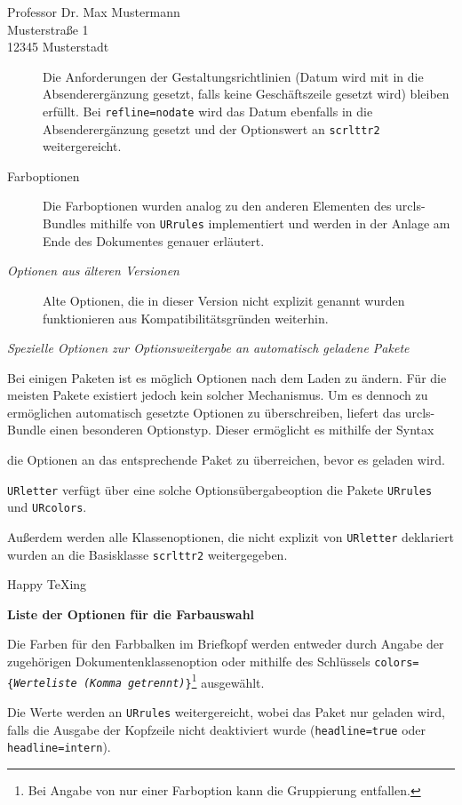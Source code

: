 \documentclass[english,parskip=half,colors={faculties,rz},headline=color]{URletter}
\newcommand*\pck[1]{\texttt{#1}}
\newcommand*\code[1]{\texttt{#1}}
\newcommand*\repl[1]{\textnormal{\textit{#1}}}
\newcommand*\cmd[1]{\par\vspace{-\parskip}\medskip\noindent\fbox{\ttfamily#1}\par\vspace{-\parskip}\medskip}
\newcommand*\heading[1]{\par\bigskip\emph{#1}\par\nobreak}
\begin{document}
\begin{letter}{Professor Dr. Max Mustermann\\Musterstraße 1\\12345 Musterstadt}
\begin{description}
	Die Anforderungen der Gestaltungsrichtlinien (Datum wird mit in die Absenderergänzung gesetzt, falls keine Geschäftszeile gesetzt wird) bleiben erfüllt. Bei \code{refline=nodate} wird das Datum ebenfalls in die Absenderergänzung gesetzt und der Optionswert an \pck{scrlttr2} weitergereicht.
	\item[Farboptionen] Die Farboptionen wurden analog zu den anderen Elementen des urcls-Bundles mithilfe von \pck{URrules} implementiert und werden in der Anlage am Ende des Dokumentes genauer erläutert.
	\item[\sffamily\itshape\mdseries Optionen aus älteren Versionen] Alte Optionen, die in dieser Version nicht explizit genannt wurden funktionieren aus Kompatibilitätsgründen weiterhin.
\end{description}

\heading{Spezielle Optionen zur Optionsweitergabe an automatisch geladene Pakete}

Bei einigen Paketen ist es möglich Optionen nach dem Laden zu ändern. Für die meisten Pakete existiert jedoch kein solcher Mechanismus. Um es dennoch zu ermöglichen automatisch gesetzte Optionen zu überschreiben, liefert das urcls-Bundle einen besonderen Optionstyp. Dieser ermöglicht es mithilfe der Syntax
\cmd{\repl{Paketname}=\{\repl{Option1},\repl{Option2}\}}
die Optionen an das entsprechende Paket zu überreichen, bevor es geladen wird.

\pck{URletter} verfügt über eine solche Optionsübergabeoption die Pakete \pck{URrules} und \pck{URcolors}.

Außerdem werden alle Klassenoptionen, die nicht explizit von \pck{URletter} deklariert wurden an die Basisklasse \pck{scrlttr2} weitergegeben.



\closing{Happy \TeX{}ing}


\end{letter}


\pagestyle{empty}
\textbf{\LARGE Liste der Optionen für die Farbauswahl}

\vspace{\baselineskip}
Die Farben für den Farbbalken im Briefkopf werden entweder durch Angabe der zugehörigen Dokumentenklassenoption oder mithilfe des Schlüssels \code{colors=\{\repl{Werteliste (Komma getrennt)}\}}\footnote{Bei Angabe von nur einer Farboption kann die Gruppierung entfallen.} ausgewählt.

Die Werte werden an \pck{URrules} weitergereicht, wobei das Paket nur geladen wird, falls die Ausgabe der Kopfzeile nicht deaktiviert wurde (\code{headline=true} oder \code{headline=intern}).
\end{document}
